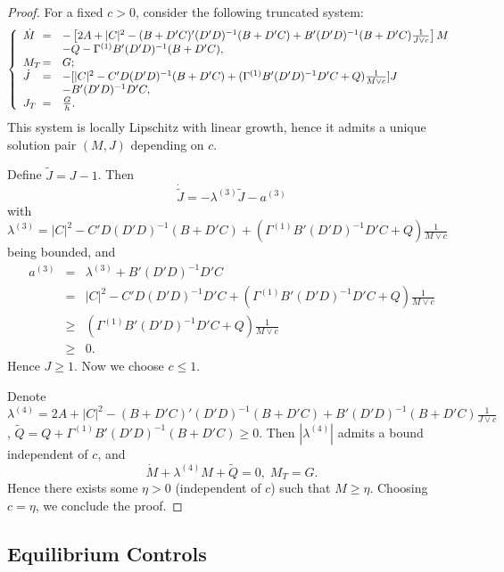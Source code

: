 \documentclass[final]{siamltex}
\begin{document}
\begin{proof}
 For a fixed $c>0$, consider the following truncated system:
 \begin{equation}\label{MJequationtr}
\left\{\begin{array}{lll}
\dot{M}\hspace{-0.3cm}&=&- \left[2A+|C|^2 -(B+D'C)'(D'D)^{-1}(B+D'C)+B'(D'D)^{-1}(B+D'C)\frac{1}{J\vee c} \right] M\\
&&-Q-\Gamma^{(1)} B'(D'D)^{-1}(B+D'C),\\
M_T\hspace{-0.3cm}&=&G;\\
\dot{J}\hspace{-0.3cm}&=&-[|C|^2- C'D(D'D)^{-1}(B+D'C)+ (\Gamma^{(1)} B'(D'D)^{-1}D'C+Q)\frac{1}{M\vee c}] J \\
   &&-B'(D'D)^{-1}D'C,\\
 J_T\hspace{-0.3cm}&=&\frac{G}{h}.\\
\end{array}\right.
\end{equation}
This system is locally Lipschitz with linear growth, hence it admits a unique solution pair  $(M,J)$ depending on $c$.

Define $\tilde J=J-1$. Then
$$\dot{\tilde J}=-\lambda^{(3)} \tilde J-a^{(3)}$$
with $\lambda^{(3)}=|C|^2- C'D(D'D)^{-1}(B+D'C)+ (\Gamma^{(1)} B'(D'D)^{-1}D'C+Q)\frac{1}{M\vee c}$ being bounded, and
\begin{eqnarray*}
   a ^{(3)}&=&\lambda^{(3)}+B'(D'D)^{-1}D'C\\
   &=&|C|^2- C'D(D'D)^{-1}D'C+ (\Gamma^{(1)} B'(D'D)^{-1}D'C+Q)\frac{1}{M\vee c}\\
   &\ge &(\Gamma^{(1)} B'(D'D)^{-1}D'C+Q)\frac{1}{M\vee c}\\
   &\ge& 0.
\end{eqnarray*}
Hence $J\ge 1$. Now we choose $c\le 1$.

Denote $\lambda^{(4)}=2A+|C|^2 -(B+D'C)'(D'D)^{-1}(B+D'C)+B'(D'D)^{-1}(B+D'C)\frac{1}{J\vee c}$, $\tilde Q=Q+\Gamma^{(1)} B'(D'D)^{-1}(B+D'C)\ge 0$. Then
$|\lambda^{(4)}|$  admits a bound independent of $c$, and
$$\dot{M}+\lambda^{(4)} M+\tilde Q=0, \; M_T=G.$$
Hence there exists some $\eta>0$ (independent of $c$) such that $M\ge \eta$.
Choosing $c=\eta$, we conclude the proof.
\end{proof}

\subsection{Equilibrium Controls}
\end{document}
